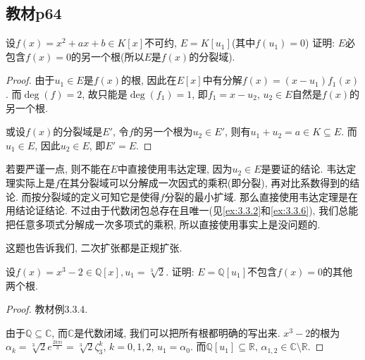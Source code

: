 \subsection{教材p64}

\begin{problem}\label{ex:3.3.1}
    设$f(x) = x^2 + ax + b \in K[x]$不可约, $E = K[u_1]$(其中$f(u_1) = 0$) 证明: $E$必包含$f(x) = 0$的另一个根(所以$E$是$f(x)$的分裂域).
\end{problem}

\begin{proof}
    由于$u_1 \in E$是$f(x)$的根, 因此在$E[x]$中有分解$f(x) = (x - u_1)f_1(x)$. 而$\deg(f) = 2$, 故只能是$\deg(f_1) = 1$, 即$f_1 = x - u_2$, $u_2 \in E$自然是$f(x)$的另一个根.

    或设$f(x)$的分裂域是$E'$, 令$f$的另一个根为$u_2 \in E'$, 则有$u_1 + u_2 = a \in K \subseteq E$. 而$u_1 \in E$, 因此$u_2 \in E$, 即$E' = E$.
\end{proof}

\begin{remark}
    若要严谨一点, 则不能在$E$中直接使用韦达定理, 因为$u_2 \in E$是要证的结论. 韦达定理实际上是$f$在其分裂域可以分解成一次因式的乘积(即分裂), 再对比系数得到的结论. 而按分裂域的定义可知它是使得$f$分裂的最小扩域. 那么直接使用韦达定理是在用结论证结论. 不过由于代数闭包总存在且唯一(见\ref{ex:3.3.2}和\ref{ex:3.3.6}), 我们总能把任意多项式分解成一次多项式的乘积, 所以直接使用事实上是没问题的.

    这题也告诉我们, 二次扩张都是正规扩张.
\end{remark}

\begin{problem}\label{ex:3.3.2}
    设$f(x) = x^3 - 2 \in \mathbb{Q}[x], u_1 = \sqrt[3]{2}$. 证明: $E = \mathbb{Q}[u_1]$不包含$f(x) = 0$的其他两个根.
\end{problem}

\begin{proof}
    教材例3.3.4.

    由于$\mathbb{Q} \subseteq \mathbb{C}$, 而$\mathbb{C}$是代数闭域, 我们可以把所有根都明确的写出来. $x^3 - 2$的根为$\alpha_k = \sqrt[3]{2}e^\frac{2k\pi i}{3} = \sqrt[3]{2}\zeta_3^k$, $k = 0, 1, 2$, $u_1 = \alpha_0$. 而$\mathbb{Q}[u_1] \subseteq \mathbb{R}$, $\alpha_{1,2} \in \mathbb{C} \setminus \mathbb{R}$.
\end{proof}


